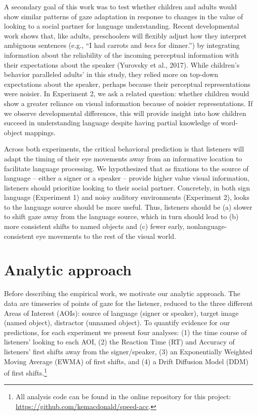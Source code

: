 \documentclass[,man,floatsintext]{apa6}
\let\rmarkdownfootnote\footnote%
\def\footnote{\protect\rmarkdownfootnote}
\begin{document}
A secondary goal of this work was to test whether children and adults would show similar patterns of gaze adaptation in response to changes in the value of looking to a social partner for language understanding. Recent developmental work shows that, like adults, preschoolers will flexibly adjust how they interpret ambiguous sentences (e.g., \enquote{I had carrots and \emph{bees} for dinner.}) by integrating information about the reliability of the incoming perceptual information with their expectations about the speaker (Yurovsky et al., 2017). While children's behavior paralleled adults' in this study, they relied more on top-down expectations about the speaker, perhaps because their perceptual representations were noisier. In Experiment 2, we ask a related question: whether children would show a greater reliance on visual information because of noisier representations. If we observe developmental differences, this will provide insight into how children succeed in understanding language despite having partial knowledge of word-object mappings.

Across both experiments, the critical behavioral prediction is that listeners will adapt the timing of their eye movements away from an informative location to facilitate language processing. We hypothesized that as fixations to the source of language -- either a signer or a speaker -- provide higher value visual information, listeners should prioritize looking to their social partner. Concretely, in both sign language (Experiment 1) and noisy auditory environments (Experiment 2), looks to the language source should be more useful. Thus, listeners should be (a) slower to shift gaze away from the language source, which in turn should lead to (b) more consistent shifts to named objects and (c) fewer early, nonlanguage-consistent eye movements to the rest of the visual world.

\hypertarget{analytic-approach}{%
\section{Analytic approach}\label{analytic-approach}}

Before describing the empirical work, we motivate our analytic approach. The data are timeseries of points of gaze for the listener, reduced to the three different Areas of Interest (AOIs): source of language (signer or speaker), target image (named object), distractor (unnamed object). To quantify evidence for our predictions, for each experiment we present four analyses: (1) the time course of listeners' looking to each AOI, (2) the Reaction Time (RT) and Accuracy of listeners' first shifts away from the signer/speaker, (3) an Exponentially Weighted Moving Average (EWMA) of first shifts, and (4) a Drift Diffusion Model (DDM) of first shifts.\footnote{All analysis code can be found in the online repository for this project: \url{https://github.com/kemacdonald/speed-acc}.}
\end{document}
